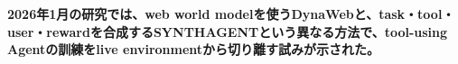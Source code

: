 \noindent\textbf{2026年1月の研究では、web world modelを使うDynaWebと、task・tool・user・rewardを合成するSYNTHAGENTという異なる方法で、tool-using Agentの訓練をlive environmentから切り離す試みが示された。}\autocite{src-01d8ab4a2c6f,src-85bc3e4f7b39}
